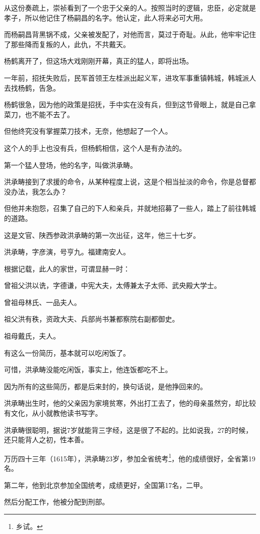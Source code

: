 \begin{multicols}{\theparacolNo}
从这份奏疏上，崇祯看到了一个忠于父亲的人。按照当时的逻辑，忠臣，必定就是孝子，所以他记住了杨嗣昌的名字。他认定，此人将来必可大用。

而杨嗣昌背黑锅不成，父亲被发配了，对他而言，莫过于奇耻。从此，他牢牢记住了那些降而复叛的人，此仇，不共戴天。

杨鹤离开了，但这场大戏刚刚开幕，真正的猛人，即将出场。

一年前，招抚失败后，民军首领王左桂派出起义军，进攻军事重镇韩城，韩城派人去找杨鹤，告急。

杨鹤很急，因为他的政策是招抚，手中实在没有兵，但到这节骨眼上，就是自己拿菜刀，也不能不去了。

但他终究没有掌握菜刀技术，无奈，他想起了一个人。

这个人的手上也没有兵，但杨鹤相信，这个人是有办法的。

第一个猛人登场，他的名字，叫做洪承畴。

洪承畴接到了求援的命令，从某种程度上说，这是个相当扯淡的命令，你是总督都没办法，我怎么办？

但他并未抱怨，召集了自己的下人和亲兵，并就地招募了一些人，踏上了前往韩城的道路。

这是文官、陕西参政洪承畴的第一次出征，这年，他三十七岁。

洪承畴，字彦演，号亨九。福建南安人。

根据记载，此人的家世，可谓显赫一时：

曾祖父洪以诜，字德谦，中宪大夫，太傅兼太子太师、武央殿大学士。

曾祖母林氏、一品夫人。

祖父洪有秩，资政大夫、兵部尚书兼都察院右副都御史。

祖母戴氏，夫人。

有这么一份简历，基本就可以吃闲饭了。

可惜，洪承畴没能吃闲饭，事实上，他连饭都吃不上。

因为所有的这些简历，都是后来封的，换句话说，是他挣回来的。

洪承畴出生时，他的父亲因为家境贫寒，外出打工去了，他的母亲虽然穷，却比较有文化，从小就教他读书写字。

洪承畴很聪明，据说7岁就能背三字经，这是很了不起的。比如说我，27的时候，还只能背人之初，性本善。

万历四十三年（1615年），洪承畴23岁，参加全省统考\footnote{乡试。}，他的成绩很好，全省第19名。

第二年，他到北京参加全国统考，成绩更好，全国第17名，二甲。

然后分配工作，他被分配到刑部。


\end{multicols}
